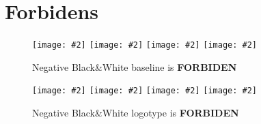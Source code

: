 \documentclass[a4paper,oneside]{article}
\newcommand{\proposition}[4][\textwidth]{%
    \begin{figure}[h]
        \centering
            \begin{minipage}[c]{#1}
                \centering
                \texttt{[image: \#2]}
                \vline{}
                \texttt{[image: \#2]}
                \vline{}
                \texttt{[image: \#2]}
                \vline{}
                \texttt{[image: \#2]}
                \caption{#3}
                \label{#4}
            \end{minipage}
    \end{figure}
}
\begin{document}
\cleardoublepage{}
\section{Forbidens}
\proposition{baseline_black-and-white_negative_cmyk.pdf}{Negative Black\&White
  baseline is \textbf{FORBIDEN}}{fig:baselineNegativeBlackWhite}
\proposition{logo_black-and-white_negative_cmyk.pdf}{Negative Black\&White
  logotype is \textbf{FORBIDEN}}{fig:logoNegativeBlackWhite}
\end{document}
